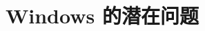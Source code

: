 \ifchinese
\section{Windows 的潜在问题}
\fi
\iffalse
\IfLanguageName{english}{
\section{Potential problems under Windows}\index{problems!Windows}
}{}
\IfLanguageName{french}{
\section{Probl\`{e}mes potentiels sous Windows}\index{probl\`{e}mes!Windows}
}{}
\fi
